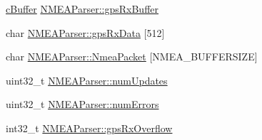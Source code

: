 \begin{DoxyCompactItemize}
\item 
\hyperlink{group__buffer_ga63b2a19263ed371e329776b34f3164eb}{c\-Buffer} \hyperlink{group___g_p_s_gadget_plugin_gae55785b07246236cfe8d6c3139becff1}{\-N\-M\-E\-A\-Parser\-::gps\-Rx\-Buffer}
\item 
char \hyperlink{group___g_p_s_gadget_plugin_gaef781170a93672b3bbc887fcabdcb369}{\-N\-M\-E\-A\-Parser\-::gps\-Rx\-Data} \mbox{[}512\mbox{]}
\item 
char \hyperlink{group___g_p_s_gadget_plugin_ga3d1bdb9e4264f153e4537750bb8d7fd9}{\-N\-M\-E\-A\-Parser\-::\-Nmea\-Packet} \mbox{[}\-N\-M\-E\-A\-\_\-\-B\-U\-F\-F\-E\-R\-S\-I\-Z\-E\mbox{]}
\item 
uint32\-\_\-t \hyperlink{group___g_p_s_gadget_plugin_ga08ee9a94774bf6691a26d600e1ea51a9}{\-N\-M\-E\-A\-Parser\-::num\-Updates}
\item 
uint32\-\_\-t \hyperlink{group___g_p_s_gadget_plugin_gaef5bd2863b92f02db2ad4ef9e66e9437}{\-N\-M\-E\-A\-Parser\-::num\-Errors}
\item 
int32\-\_\-t \hyperlink{group___g_p_s_gadget_plugin_gaf0b70b48a4a5943f40dc14c11b8e0712}{\-N\-M\-E\-A\-Parser\-::gps\-Rx\-Overflow}
\end{DoxyCompactItemize}
